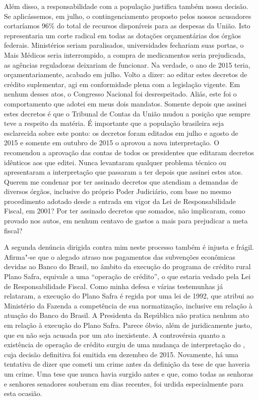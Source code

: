 Além disso, a responsabilidade com a
população justifica também nossa decisão. Se aplicássemos, em julho, o
contingenciamento proposto pelos nossos acusadores cortaríamos 96\% do
total de recursos disponíveis para as despesas da União. Isto
representaria um corte radical em todas as dotações orçamentárias dos
órgãos federais. Ministérios seriam paralisados, universidades fechariam
suas portas, o Mais Médicos seria interrompido, a compra de medicamentos
seria prejudicada, as agências reguladoras deixariam de funcionar. Na
verdade, o ano de 2015 teria, orçamentariamente, acabado em julho. Volto
a dizer: ao editar estes decretos de crédito suplementar, agi em
conformidade plena com a legislação vigente. Em nenhum desses atos, o
Congresso Nacional foi desrespeitado. Aliás, este foi o comportamento
que adotei em meus dois mandatos. Somente depois que assinei estes
decretos é que o Tribunal de Contas da União mudou a posição que sempre
teve a respeito da matéria. É importante que a população brasileira seja
esclarecida sobre este ponto: os decretos foram editados em julho e
agosto de 2015 e somente em outubro de 2015 o  aprovou a nova
interpretação. O  recomendou a aprovação das contas de todos os
presidentes que editaram decretos idênticos aos que editei. Nunca
levantaram qualquer problema técnico ou apresentaram a interpretação que
passaram a ter depois que assinei estes atos. Querem me condenar por ter
assinado decretos que atendiam a demandas de diversos órgãos, inclusive
do próprio Poder Judiciário, com base no mesmo procedimento adotado
desde a entrada em vigor da Lei de Responsabilidade Fiscal, em 2001? Por
ter assinado decretos que somados, não implicaram, como provado nos
autos, em nenhum centavo de gastos a mais para prejudicar a meta fiscal?

A segunda denúncia dirigida contra mim neste processo também é injusta e
frágil. Afirma"-se que o alegado atraso nos pagamentos das subvenções
econômicas devidas ao Banco do Brasil, no âmbito da execução do programa
de crédito rural Plano Safra, equivale a uma ``operação de crédito'', o
que estaria vedado pela Lei de Responsabilidade Fiscal. Como minha
defesa e várias testemunhas já relataram, a execução do Plano Safra é
regida por uma lei de 1992, que atribui ao Ministério da Fazenda a
competência de sua normatização, inclusive em relação à atuação do Banco
do Brasil. A Presidenta da República não pratica nenhum ato em relação à
execução do Plano Safra. Parece óbvio, além de juridicamente justo, que
eu não seja acusada por um ato inexistente. A controvérsia quanto a
existência de operação de crédito surgiu de uma mudança de interpretação
do , cuja decisão definitiva foi emitida em dezembro de 2015.
Novamente, há uma tentativa de dizer que cometi um crime antes da
definição da tese de que haveria um crime. Uma tese que nunca havia
surgido antes e que, como todas as senhoras e senhores senadores
souberam em dias recentes, foi urdida especialmente para esta ocasião.


